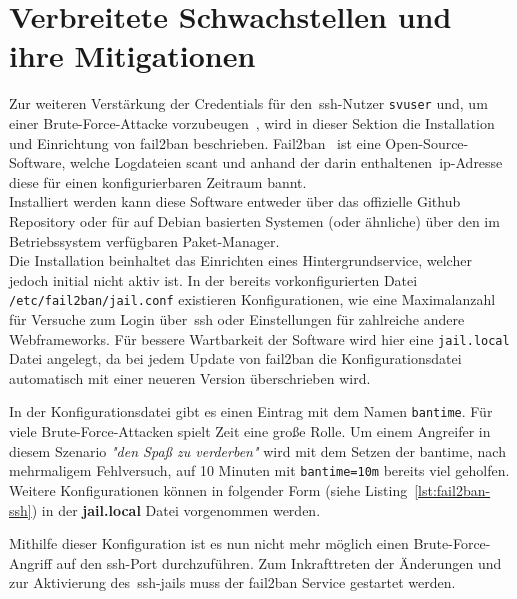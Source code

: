 
\section{Verbreitete Schwachstellen und ihre Mitigationen}\label{sec:bekannte-schwachstellen-und-ihre-mitegationen}
Zur weiteren Verstärkung der Credentials für den~\gls{ssh}-Nutzer \texttt{svuser} und, um einer Brute-Force-Attacke vorzubeugen~\cite{rasp-vuln-prev},
wird in dieser Sektion die Installation und Einrichtung von fail2ban beschrieben.
Fail2ban~\cite{fail2ban} ist eine Open-Source-Software, welche Logdateien scant und anhand der darin enthaltenen~\gls{ip}-Adresse diese für einen konfigurierbaren
Zeitraum bannt. \\
Installiert werden kann diese Software entweder über das offizielle Github Repository oder für auf Debian basierten Systemen (oder ähnliche) über den im
Betriebssystem verfügbaren Paket-Manager.
\\
Die Installation beinhaltet das Einrichten eines Hintergrundservice, welcher jedoch initial nicht aktiv ist.
In der bereits vorkonfigurierten Datei \texttt{/etc/fail2ban/jail.conf} existieren Konfigurationen, wie
eine Maximalanzahl für Versuche zum Login über~\gls{ssh} oder Einstellungen für zahlreiche andere Webframeworks.
Für bessere Wartbarkeit der Software wird hier eine \texttt{jail.local} Datei angelegt, da bei jedem Update von fail2ban die Konfigurationsdatei automatisch mit einer
neueren Version überschrieben wird.

In der Konfigurationsdatei gibt es einen Eintrag mit dem Namen \texttt{bantime}.
Für viele Brute-Force-Attacken spielt Zeit eine große Rolle.
Um einem Angreifer in diesem Szenario \textit{"den Spaß zu verderben"} wird mit dem Setzen der bantime, nach mehrmaligem Fehlversuch, auf 10 Minuten mit \texttt{bantime=10m}
bereits viel geholfen.
Weitere Konfigurationen können in folgender Form (siehe Listing~\ref{lst:fail2ban-ssh}) in der \textbf{jail.local} Datei vorgenommen werden.
\pagebreak

Mithilfe dieser Konfiguration ist es nun nicht mehr möglich einen Brute-Force-Angriff auf den \gls{ssh}-Port durchzuführen.
Zum Inkrafttreten der Änderungen und zur Aktivierung des~\gls{ssh}-jails muss der fail2ban Service gestartet werden.
